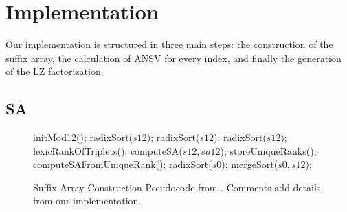 \chapter{Implementation}
\label{chap:implementation}

Our implementation is structured in three main steps: the construction of the suffix array, the calculation of ANSV for every index, and finally the generation of the LZ factorization.

\section{SA}
\label{sec:sa}

\begin{figure}[h]
\begin{algorithmic}[1]
\State initMod12();
\State radixSort($s12$);
\State radixSort($s12$); 
\State radixSort($s12$); 
\State lexicRankOfTriplets();
\State computeSA($s12,sa12$);
\State storeUniqueRanks();
\Else
\State computeSAFromUniqueRank();
\EndIf
\State radixSort($s0$); 
\State mergeSort($s0,s12$); 
\EndProcedure
\end{algorithmic}
\caption{Suffix Array Construction Pseudocode from \cite{Deo}. Comments add details from our implementation.}
\label{algorithm:sa}
\end{figure}

